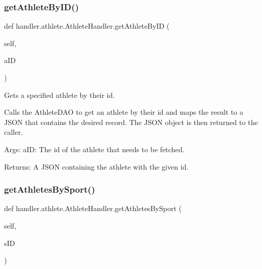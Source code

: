 \subsubsection{\texorpdfstring{get\+Athlete\+By\+I\+D()}{getAthleteByID()}}
{\footnotesize\ttfamily def handler.\+athlete.\+Athlete\+Handler.\+get\+Athlete\+By\+ID (\begin{DoxyParamCaption}\item[{}]{self,  }\item[{}]{a\+ID }\end{DoxyParamCaption})}

\begin{DoxyVerb}Gets a specified athlete by their id.

Calls the AthleteDAO to get an athlete by their id 
and maps the result to a JSON that contains the desired 
record. The JSON object is then returned to the caller.

Args:
    aID: The id of the athlete that needs to be fetched.

Returns:
    A JSON containing the athlete with the given id.\end{DoxyVerb}
 \mbox{\label{classhandler_1_1athlete_1_1_athlete_handler_af33bd416854d51f10a33aa264f1e3b2f}} 
\subsubsection{\texorpdfstring{get\+Athletes\+By\+Sport()}{getAthletesBySport()}}
{\footnotesize\ttfamily def handler.\+athlete.\+Athlete\+Handler.\+get\+Athletes\+By\+Sport (\begin{DoxyParamCaption}\item[{}]{self,  }\item[{}]{s\+ID }\end{DoxyParamCaption})}

